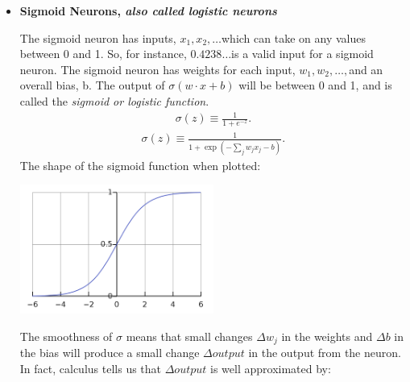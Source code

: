\documentclass[a4paper, oneside,11pt]{article}
\begin{document}
\begin{itemize}
	\item \textbf{Sigmoid Neurons, \textit{also called logistic neurons}}

		The sigmoid neuron has inputs, \begin{math}x_1, x_2, \ldots \end{math}which can take on any values between 0 and 1. So, for instance, \begin{math}0.4238\ldots \end{math}is a valid input for a sigmoid neuron. The sigmoid neuron has weights for each input, \begin{math}w_1, w_2, \ldots, \end{math}and an overall bias, b.  The output of \begin{math}\sigma(w \cdot x+b)\end{math} will be between 0 and 1, and is called the \textit{sigmoid or logistic function}.
		\begin{eqnarray} 
		  \sigma(z) \equiv \frac{1}{1+e^{-z}}.
		\end{eqnarray}
		\begin{eqnarray} 
		  \sigma(z) \equiv \frac{1}{1+\exp(-\sum_j w_j x_j-b)}.
		\end{eqnarray}
		The shape of the sigmoid function when plotted:
		\begin{center}
			\large{ \includegraphics[width=0.5\textwidth]{sigmoid_function.png}}
		\end{center}
		The smoothness of \begin{math}\sigma\end{math} means that small changes \begin{math}\Delta w_j\end{math} in the weights and \begin{math}\Delta b\end{math} in the bias will produce a small change \begin{math}\Delta output\end{math} in the output from the neuron. In fact, calculus tells us that \begin{math}\Delta output\end{math} is well approximated by:

\end{itemize}
\end{document}
